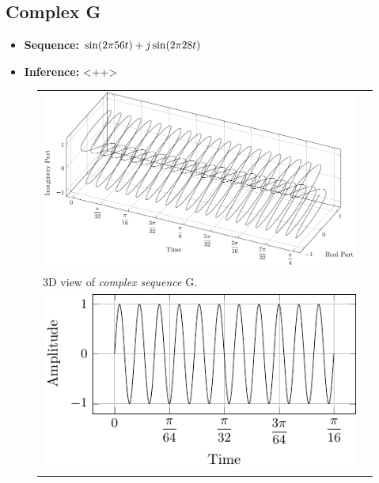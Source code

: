 \documentclass[../../course]{subfiles}
\begin{document}
\subsection{Complex G}

\begin{itemize} [label=]

    \item \textbf{Sequence:} $\sin(2 \pi 56 t) + j \sin(2 \pi 28 t)$

    \item \textbf{Inference:} <++>

\end{itemize}

\begin{figure} [H]

    \renewcommand{\arraystretch}{0.75}
    \centering
    \begin{NiceTabularX} {\textwidth} {
            *{2}{>{\centering\arraybackslash}X}
        }

         {
             {
                \includegraphics[height = \textheight] {tikzpics/plotComplexG.pdf}
            }
        }

        &
        \\

         {
            \vbox{
                 {3D view of \emph{complex sequence} G.}
                \label{plt:cmplxG}
            }
        }

        &
        \\

         {
             {
                \includegraphics[height = \textheight] {tikzpics/plotShortX3.pdf}
            }
        }


\end{NiceTabularX}
\end{figure}
\end{document}
